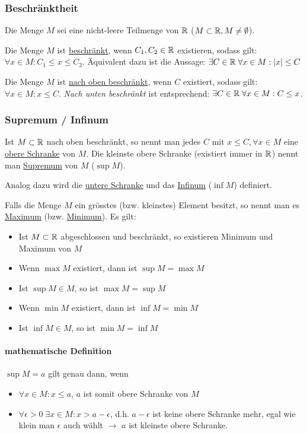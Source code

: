 \begin{multicols}{2}
\subsubsection{Beschränktheit}
Die Menge $M$ sei eine nicht-leere Teilmenge von $\mathbb{R}$ ($M \subset \mathbb{R}, M \neq \emptyset$).

Die Menge $M$ ist \underline{beschränkt}, wenn $C_1, C_2 \in \mathbb{R}$ existieren, sodass gilt: $\forall x \in M: C_1 \leq x \leq C_2$.
Äquivalent dazu ist die Aussage: $\exists C \in \mathbb{R} \; \forall x \in M: |x| \leq C$

Die Menge $M$ ist \underline{nach oben beschränkt}, wenn $C$ existiert, sodass gilt: $\forall x \in M: x \leq C$. \textit{Nach unten beschränkt} ist
entsprechend: $\exists C \in \mathbb{R} \; \forall x \in M: C \leq x$.

\subsubsection{Supremum / Infinum}
Ist $M \subset \mathbb{R}$ nach oben beschränkt, so nennt man jedes $C$ mit $x \leq C, \forall x \in M$
eine \underline{obere Schranke} von $M$. Die kleinste obere Schranke (existiert immer in $\mathbb{R}$) nennt man \underline{Supremum} von $M$ ($\sup M$).

Analog dazu wird die \underline{untere Schranke} und das \underline{Infinum} ($\inf M$) definiert.

Falls die Menge $M$ ein grösstes (bzw. kleinstes) Element besitzt, so nennt man es \underline{Maximum} (bzw. \underline{Minimum}).
Es gilt:
\begin{itemize}
	\item Ist $M \subset \mathbb{R}$ abgeschlossen und beschränkt, so existieren Minimum und Maximum von $M$
	\item Wenn $\max M$ existiert, dann ist $\sup M = \max M$
	\item Ist $\sup M \in M$, so ist $\max M = \sup M$
	\item Wenn $\min M$ existiert, dann ist $\inf M = \min M$
	\item Ist $\inf M \in M$, so ist $\min M = \inf M$
\end{itemize}

\paragraph{mathematische Definition}
$\sup M = a$ gilt genau dann, wenn
\begin{itemize}
	\item $\forall x \in M: x \leq a$, $a$ ist somit obere Schranke von $M$
	\item $\forall \epsilon > 0 \; \exists x \in M: x > a - \epsilon$, d.h. $a - \epsilon$ ist keine obere Schranke mehr, egal wie klein man $\epsilon$ auch wählt $\rightarrow$ $a$ ist kleinste obere Schranke.
\end{itemize}


\end{multicols}
